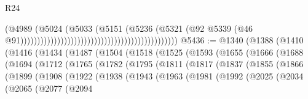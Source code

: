 \begin{lexlean}{R24}
\begin{coremodule}
                                                                                  (@4989
                                                                                    (@5024
                                                                                      (@5033
                                                                                        (@5151
                                                                                          (@5236
                                                                                            (@5321
                                                                                              (@92
                                                                                                @5339
                                                                                                (@46
                                                                                                  @91)))))))))))))))))))))))))))))))))))))))))))))))
@5436 := @1340
    (@1388
      (@1410
        (@1416
          (@1434
            (@1487
              (@1504
                (@1518
                  (@1525
                    (@1593
                      (@1655
                        (@1666
                          (@1688
                            (@1694
                              (@1712
                                (@1765
                                  (@1782
                                    (@1795
                                      (@1811
                                        (@1817
                                          (@1837
                                            (@1855
                                              (@1866
                                                (@1899
                                                  (@1908
                                                    (@1922
                                                      (@1938
                                                        (@1943
                                                          (@1963
                                                            (@1981
                                                              (@1992
                                                                (@2025
                                                                  (@2034
                                                                    (@2065
                                                                      (@2077
                                                                        (@2094

\end{coremodule}
\end{lexlean}
